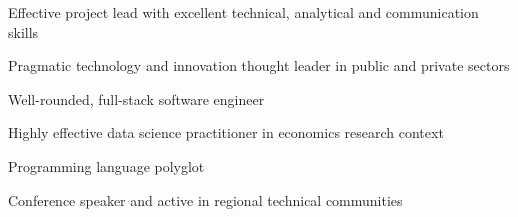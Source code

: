 

\begin{cvparagraph}

      \begin{cvitems}
        \item Effective project lead with excellent technical, analytical and communication skills
        \item Pragmatic technology and innovation thought leader in public and private sectors
        \item Well-rounded, full-stack software engineer
        \item Highly effective data science practitioner in economics research context
        \item Programming language polyglot
        \item Conference speaker and active in regional technical communities
      \end{cvitems}

\end{cvparagraph}
